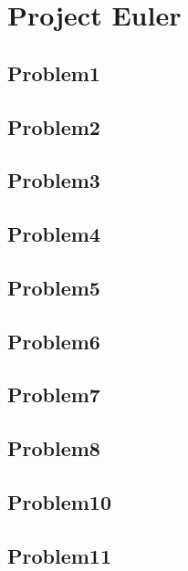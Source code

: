 \chapter{Project Euler}
\section{Problem1}

\section{Problem2}

\section{Problem3}

\section{Problem4}

\section{Problem5}

\section{Problem6}

\section{Problem7}

\section{Problem8}

\section{Problem10}


\section{Problem11}


